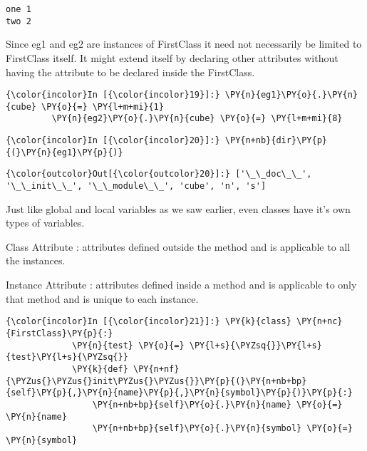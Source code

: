     \begin{Verbatim}[commandchars=\\\{\}]
one 1
two 2
    \end{Verbatim}

    Since eg1 and eg2 are instances of FirstClass it need not necessarily be
limited to FirstClass itself. It might extend itself by declaring other
attributes without having the attribute to be declared inside the
FirstClass.

    \begin{Verbatim}[commandchars=\\\{\}]
{\color{incolor}In [{\color{incolor}19}]:} \PY{n}{eg1}\PY{o}{.}\PY{n}{cube} \PY{o}{=} \PY{l+m+mi}{1}
         \PY{n}{eg2}\PY{o}{.}\PY{n}{cube} \PY{o}{=} \PY{l+m+mi}{8}
\end{Verbatim}

    \begin{Verbatim}[commandchars=\\\{\}]
{\color{incolor}In [{\color{incolor}20}]:} \PY{n+nb}{dir}\PY{p}{(}\PY{n}{eg1}\PY{p}{)}
\end{Verbatim}

            \begin{Verbatim}[commandchars=\\\{\}]
{\color{outcolor}Out[{\color{outcolor}20}]:} ['\_\_doc\_\_', '\_\_init\_\_', '\_\_module\_\_', 'cube', 'n', 's']
\end{Verbatim}
        
    Just like global and local variables as we saw earlier, even classes
have it's own types of variables.

Class Attribute : attributes defined outside the method and is
applicable to all the instances.

Instance Attribute : attributes defined inside a method and is
applicable to only that method and is unique to each instance.

    \begin{Verbatim}[commandchars=\\\{\}]
{\color{incolor}In [{\color{incolor}21}]:} \PY{k}{class} \PY{n+nc}{FirstClass}\PY{p}{:}
             \PY{n}{test} \PY{o}{=} \PY{l+s}{\PYZsq{}}\PY{l+s}{test}\PY{l+s}{\PYZsq{}}
             \PY{k}{def} \PY{n+nf}{\PYZus{}\PYZus{}init\PYZus{}\PYZus{}}\PY{p}{(}\PY{n+nb+bp}{self}\PY{p}{,}\PY{n}{name}\PY{p}{,}\PY{n}{symbol}\PY{p}{)}\PY{p}{:}
                 \PY{n+nb+bp}{self}\PY{o}{.}\PY{n}{name} \PY{o}{=} \PY{n}{name}
                 \PY{n+nb+bp}{self}\PY{o}{.}\PY{n}{symbol} \PY{o}{=} \PY{n}{symbol}
\end{Verbatim}

